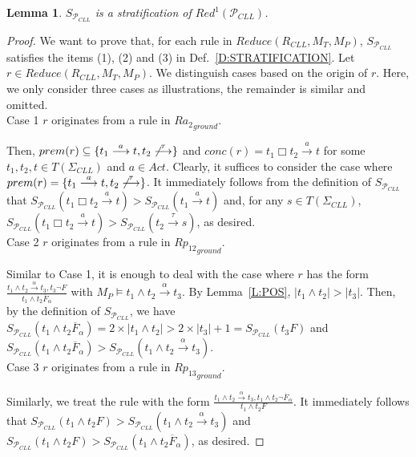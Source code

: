 \documentclass{elsarticle}
\theoremstyle{plain}
\newtheorem{lemma}[theorem]{Lemma}
\theoremstyle{definition}
\begin{document}
\begin{lemma}\label{L:Stratification}
    $S_{{\mathcal P}_{CLL}}$ is a stratification of ${Red^1}({\mathcal P}_{CLL})$.
\end{lemma}
\begin{proof}


    We want to prove that, for each rule in $ Reduce({R_{CLL}}, M_T, M_P)$, $S_{{\mathcal P}_{CLL}}$ satisfies the items (1), (2) and (3) in Def.~\ref{D:STRATIFICATION}.
    Let $r \in Reduce({R_{CLL}}, M_T, M_P)$.
    We distinguish cases based on the origin of $r$. Here, we only consider three cases as illustrations, the remainder is similar and omitted.\\

\noindent Case 1 $r$ originates from a rule in ${Ra_2}_{ground}$.


    Then, $prem(r) \subseteq \{t_1 \stackrel{a}{\longrightarrow} t, t_2 \not \stackrel{\tau}{\longrightarrow}\}$ and $conc(r)=t_1 \Box t_2 \stackrel{a}{\longrightarrow} t$ for some $t_1,t_2,t \in T(\Sigma_{CLL})$ and $a \in Act$.
    Clearly, it suffices to consider the case where $prem(r) = \{t_1 \stackrel{a}{\longrightarrow} t, t_2 \not \stackrel{\tau}{\longrightarrow}\}$.
    It immediately follows from the definition of $S_{{\mathcal P}_{CLL}}$ that $ S_{{\mathcal P}_{CLL}}(t_1 \Box t_2 \stackrel{a}{\longrightarrow} t)> S_{{\mathcal P}_{CLL}}(t_1 \stackrel{a}{\longrightarrow} t )$ and, for any $s \in T(\Sigma_{CLL})$, $ S_{{\mathcal P}_{CLL}}(t_1 \Box t_2 \stackrel{a}{\longrightarrow} t)> S_{{\mathcal P}_{CLL}}(t_2 \stackrel{\tau}{\longrightarrow} s )$, as desired.\\

\noindent Case 2 $r$ originates from a rule in ${Rp_{12}}_{ground}$.

    Similar to Case 1, it is enough to deal with the case where $r$ has the form $\frac{t_1 \wedge t_2 \stackrel{\alpha}{\longrightarrow} t_3, t_3 \neg F}{t_1 \wedge t_2 \overline{F}_{\alpha}}$ with $M_P\models t_1 \wedge t_2 \stackrel{\alpha}{\longrightarrow} t_3$.
By Lemma~\ref{L:POS}, $|t_1 \wedge t_2 |>|t_3|$.
    Then, by the definition of $S_{{\mathcal P}_{CLL}}$, we have $S_{{\mathcal P}_{CLL}}(t_1 \wedge t_2 \overline{F}_{\alpha}) = 2\times |t_1 \wedge t_2| > 2\times |t_3|+1 = S_{{\mathcal P}_{CLL}}(t_3F)$
    and $S_{{\mathcal P}_{CLL}}({t_1 \wedge t_2}{\overline{F}}_{\alpha}) > S_{{\mathcal P}_{CLL}}(t_1 \wedge t_2 \stackrel{\alpha}{\longrightarrow}t_3)$.   \\

\noindent Case 3 $r$ originates from a rule in ${Rp_{13}}_{ground}$.

    Similarly, we treat the rule with the form $\frac{t_1 \wedge t_2\stackrel{\alpha}{\longrightarrow} t_3, t_1 \wedge t_2 \neg \overline{F}_{\alpha}}{t_1 \wedge t_2 F}$.
It immediately follows that $S_{{\mathcal P}_{CLL}}({t_1 \wedge t_2}F) > S_{{\mathcal P}_{CLL}}(t_1 \wedge t_2 \stackrel{\alpha}{\longrightarrow}t_3)$ and $S_{{\mathcal P}_{CLL}}({t_1 \wedge t_2}F) > S_{{\mathcal P}_{CLL}}(t_1 \wedge t_2 {\overline{F}}_{\alpha})$, as desired.
\end{proof}
\end{document}
